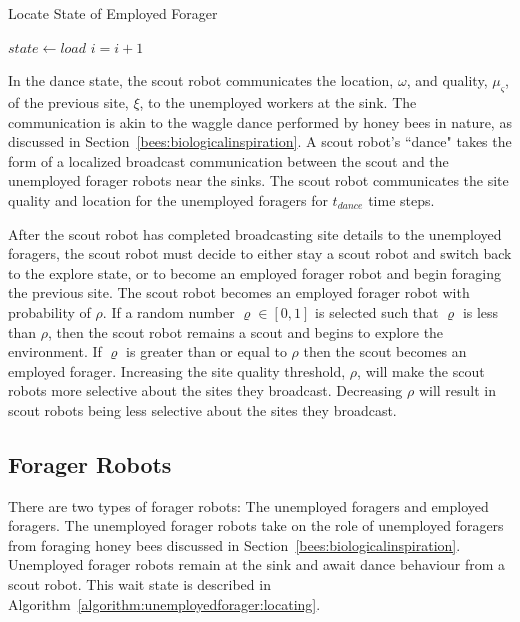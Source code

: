 \begin{algorithm}
\caption{Locate State of Employed Forager}
\label{algorithm:employedforager:locating}
\begin{algorithmic}[1]
	\State {}
	\State {}
		\State $state \gets load$
	\EndIf
	\State $i =i + 1$
\EndFunction
\end{algorithmic}
\end{algorithm}

In the dance state, the scout robot communicates the location, $\omega$, and quality, $\mu_\varsigma$, of the previous site, $\xi$, to the unemployed workers at the sink. The communication is akin to the waggle dance performed by honey bees in nature, as discussed in Section~\ref{bees:biologicalinspiration}. A scout robot's ``dance" takes the form of a localized broadcast communication between the scout and the unemployed forager robots near the sinks. The scout robot communicates the site quality and location for the unemployed foragers for $t_{dance}$ time steps.

After the scout robot has completed broadcasting site details to the unemployed foragers, the scout robot must decide to either stay a scout robot and switch back to the explore state, or to become an employed forager robot and begin foraging the previous site. The scout robot becomes an employed forager robot with probability of $\rho$. If a random number $\varrho\in[0,1]$ is selected such that $\varrho$ is less than $\rho$, then the scout robot remains a scout and begins to explore the environment. If $\varrho$ is greater than or equal to $\rho$ then the scout becomes an employed forager. Increasing the site quality threshold, $\rho$, will make the scout robots more selective about the sites they broadcast. Decreasing $\rho$ will result in scout robots being less selective about the sites they broadcast.

\subsection{Forager Robots}
\label{foragerrobots}

There are two types of forager robots: The unemployed foragers and employed foragers. The unemployed forager robots take on the role of unemployed foragers from foraging honey bees discussed in Section~\ref{bees:biologicalinspiration}. Unemployed forager robots remain at the sink and await dance behaviour from a scout robot. This wait state is described in Algorithm~\ref{algorithm:unemployedforager:locating}.


